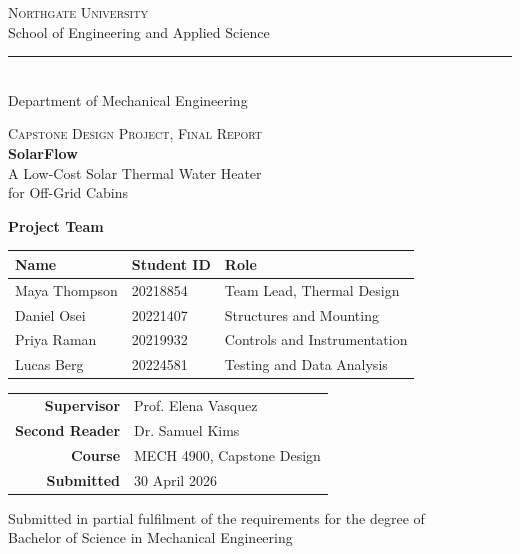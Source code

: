 \documentclass[11pt]{article}
\begin{document}
\begin{titlepage}
\begin{center}

{\large\scshape Northgate University}\\
{\small School of Engineering and Applied Science}\\[0.3em]
{\color{accent}\rule{0.55\textwidth}{1pt}}\\[0.2em]
{\small Department of Mechanical Engineering}

\vspace{2.4cm}

{\small\scshape Capstone Design Project, Final Report}\\[0.8em]
{\Huge\bfseries\color{accent} SolarFlow}\\[0.5em]
{\LARGE A Low-Cost Solar Thermal Water Heater\\[0.2em] for Off-Grid Cabins}

\vspace{2.2cm}

{\large\bfseries\color{accent} Project Team}\\[0.6em]
\begin{tabular}{l l l}
\toprule
\textbf{Name} & \textbf{Student ID} & \textbf{Role} \\
\midrule
Maya Thompson & 20218854 & Team Lead, Thermal Design \\
Daniel Osei & 20221407 & Structures and Mounting \\
Priya Raman & 20219932 & Controls and Instrumentation \\
Lucas Berg & 20224581 & Testing and Data Analysis \\
\bottomrule
\end{tabular}

\vspace{1.8cm}

\begin{tabular}{r l}
\textbf{Supervisor} & Prof. Elena Vasquez \\
\textbf{Second Reader} & Dr. Samuel Kims \\
\textbf{Course} & MECH 4900, Capstone Design \\
\textbf{Submitted} & 30 April 2026 \\
\end{tabular}

\vfill

{\small Submitted in partial fulfilment of the requirements for the degree of\\
Bachelor of Science in Mechanical Engineering}

\end{center}
\end{titlepage}
\end{document}
